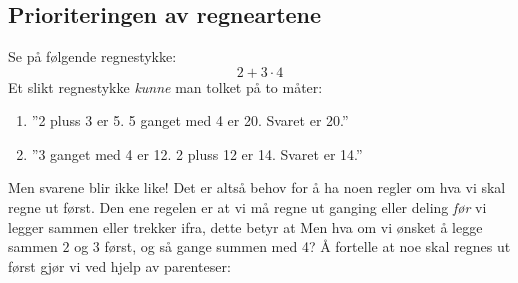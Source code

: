 




	\section{\rrek}
	\subsection*{Prioriteringen av regneartene}
	Se på følgende regnestykke:
	\[ 2+3\cdot4 \]
	Et slikt regnestykke \textsl{kunne} man tolket på to måter:
	\begin{enumerate}[label=(\roman*)]
		\item ''2 pluss 3 er 5. 5 ganget med 4 er 20. Svaret er 20.''
		\item ''3 ganget med 4 er 12. 2 pluss 12 er 14. Svaret er 14.''
	\end{enumerate}
	Men svarene blir ikke like! Det er altså behov for å ha noen regler om hva vi skal regne ut først. Den ene regelen er at vi må regne ut ganging eller deling \textsl{før} vi legger sammen eller trekker ifra, dette betyr at \regv
	\st{ \vs
	}
	Men hva om vi ønsket å legge sammen $ 2 $ og $ 3 $ først, og så gange summen med 4? Å fortelle at noe skal regnes ut først gjør vi ved hjelp av parenteser: \regv
	\st{\vs
	}\regv
	
	\newpage
